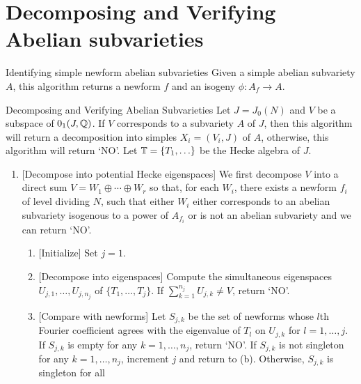 \documentclass[11pt, proquest]{uwthesis}
\begin{document}
\section{Decomposing and Verifying Abelian subvarieties}

\begin{algorithm}{Identifying simple newform abelian subvarieties}%
    \label{alg:identifying_simples}
    Given a simple abelian subvariety $A$, this algorithm returns a newform $f$ and
    an isogeny $\phi:A_f\to A$.
\end{algorithm}

\begin{algorithm}{Decomposing and Verifying Abelian Subvarieties}
    \label{alg:decomp_and_verify_subvarieties}
    Let $J=J_0(N)$ and $V$ be a subspace of $0_1(J, \mathbb{Q})$. If $V$ corresponds
    to a subvariety $A$ of $J$, then this algorithm will return a decomposition
    into simples $X_i=(V_i, J)$ of $A$, otherwise, this algorithm will return
    `NO'. Let $\mathbb{T}=\{T_1,\ldots\}$ be the Hecke algebra of $J$.
    \begin{enumerate}
        \item{} [Decompose into potential Hecke eigenspaces]
            We first decompose $V$ into a direct sum $V=W_1\oplus \cdots \oplus
            W_r$ so that, for each $W_i$, there exists a newform $f_i$ of level
            dividing $N$, such that either $W_i$ either corresponds to an
            abelian subvariety isogenous to a power of $A_{f_i}$ or is not an
            abelian subvariety and we can return `NO'.
            \begin{enumerate}
                \item{} [Initialize]
                    Set $j=1$.
                \item{} [Decompose into eigenspaces]
                    Compute the simultaneous eigenspaces $U_{j,1},\ldots,U_{j,
                    n_j}$ of $\{T_1,\ldots,T_j\}$. If $\sum_{k=1} ^{n_j}
                    U_{j, k}\neq V$, return `NO'.
                \item{} [Compare with newforms]
                    Let $S_{j,k}$ be the set of newforms whose $l$th Fourier
                    coefficient agrees with the eigenvalue of $T_l$ on $U_{j,
                    k}$ for $l=1,\ldots,j$. If $S_{j, k}$ is empty for any
                    $k=1,\ldots,n_j$, return `NO'. If $S_{j,k}$ is not
                    singleton for any $k=1,\ldots, n_j$, increment $j$ and
                    return to (b). Otherwise, $S_{j,k}$ is singleton for all

\end{enumerate}
\end{enumerate}
\end{algorithm}
\end{document}
